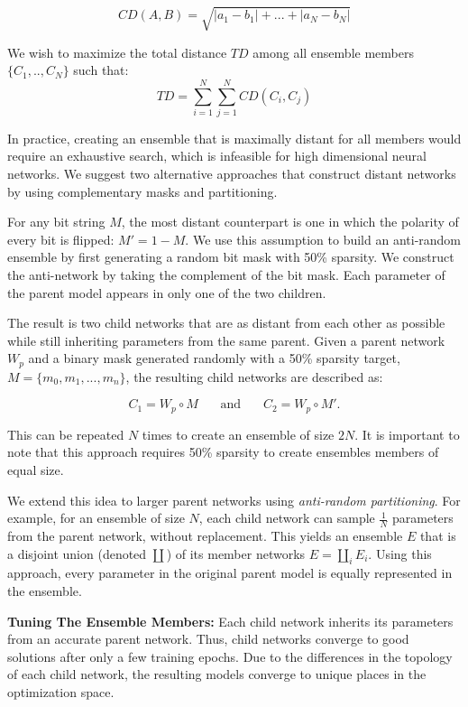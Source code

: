 \documentclass[letterpaper]{article} %
\begin{document}
\[
CD(A,B) = \sqrt{|a_1 - b_1| + ... + |a_N - b_N|}
\]


We wish to maximize the total distance $TD$ among all ensemble members $\{C_1, .., C_{N}\}$ such that:
%
\[ 
TD = \sum_{i=1}^{N} \sum_{j=1}^{N} CD(C_i, C_j)
\]

In practice, creating an ensemble that is maximally distant for all members would require an exhaustive search, which is infeasible for high dimensional neural networks. We suggest two alternative approaches that construct distant networks by using complementary masks and partitioning.

For any bit string $M$, the most distant counterpart is one in which the polarity of every bit is flipped: $M' =  1 - M$. We use this assumption to build an anti-random ensemble by first generating a random bit mask with 50\% sparsity. We construct the anti-network by taking the complement of the bit mask.  Each parameter of the parent model appears in only one of the two children.

The result is two child networks that are as distant from each other as possible while still inheriting parameters from the same parent. Given a parent network $W_p$ and a binary mask generated randomly with a 50\% sparsity target, $M = \{m_0, m_1, ..., m_n\}$, the resulting child networks are described as:

\[ C_1 = W_p \circ M ~~~~~~~~  \mbox{and} ~~~~~~~~ C_2 = W_p \circ M'. \]

This can be repeated $N$ times to create an ensemble of size $2N$. It is important to note that this approach requires 50\% sparsity to create ensembles members of equal size.

We extend this idea to larger parent networks using {\em anti-random partitioning}. For example, for an ensemble of size $N$, each child network can sample $\frac{1}{N}$ parameters from the parent network, without replacement.
This yields an ensemble $E$ that is a disjoint union (denoted $\coprod$) of its member networks $E = \coprod_{i} E_{i}.$  
Using this approach, every parameter in the original parent model is equally represented in the ensemble.

\textbf{Tuning The Ensemble Members:} Each child network inherits its parameters from an accurate parent network. 
Thus, child networks converge to good solutions after 
only a few training epochs. Due to the differences in the topology of each child network, the resulting models converge to unique places in the optimization space. 
\end{document}

